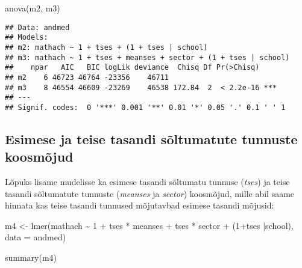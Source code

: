 \documentclass[
]{book}
\newenvironment{Shaded}{\begin{snugshade}}{\end{snugshade}}
\newcommand{\AttributeTok}[1]{\textcolor[rgb]{0.77,0.63,0.00}{#1}}
\newcommand{\DecValTok}[1]{\textcolor[rgb]{0.00,0.00,0.81}{#1}}
\newcommand{\FunctionTok}[1]{\textcolor[rgb]{0.00,0.00,0.00}{#1}}
\newcommand{\NormalTok}[1]{#1}
\newcommand{\OtherTok}[1]{\textcolor[rgb]{0.56,0.35,0.01}{#1}}
\newcommand{\SpecialCharTok}[1]{\textcolor[rgb]{0.00,0.00,0.00}{#1}}
\begin{document}
\begin{Shaded}
\begin{Highlighting}[]
\FunctionTok{anova}\NormalTok{(m2, m3)}
\end{Highlighting}
\end{Shaded}

\begin{verbatim}
## Data: andmed
## Models:
## m2: mathach ~ 1 + tses + (1 + tses | school)
## m3: mathach ~ 1 + tses + meanses + sector + (1 + tses | school)
##    npar   AIC   BIC logLik deviance  Chisq Df Pr(>Chisq)    
## m2    6 46723 46764 -23356    46711                         
## m3    8 46554 46609 -23269    46538 172.84  2  < 2.2e-16 ***
## ---
## Signif. codes:  0 '***' 0.001 '**' 0.01 '*' 0.05 '.' 0.1 ' ' 1
\end{verbatim}

\hypertarget{esimese-ja-teise-tasandi-suxf5ltumatute-tunnuste-koosmuxf5jud}{%
\subsection{Esimese ja teise tasandi sõltumatute tunnuste koosmõjud}\label{esimese-ja-teise-tasandi-suxf5ltumatute-tunnuste-koosmuxf5jud}}

Lõpuks lisame mudelisse ka esimese tasandi sõltumatu tunnuse (\emph{tses}) ja teise tasandi sõltumatute tunnuste (\emph{meanses} ja \emph{sector}) koosmõjud, mille abil saame hinnata kas teise tasandi tunnused mõjutavbad esimese tasandi mõjusid:

\begin{Shaded}
\begin{Highlighting}[]
\NormalTok{m4 }\OtherTok{\textless{}{-}} \FunctionTok{lmer}\NormalTok{(mathach }\SpecialCharTok{\textasciitilde{}} \DecValTok{1} \SpecialCharTok{+}\NormalTok{ tses }\SpecialCharTok{*}\NormalTok{ meanses }\SpecialCharTok{+}\NormalTok{ tses }\SpecialCharTok{*}\NormalTok{ sector }\SpecialCharTok{+}\NormalTok{ (}\DecValTok{1}\SpecialCharTok{+}\NormalTok{tses }\SpecialCharTok{|}\NormalTok{school), }\AttributeTok{data =}\NormalTok{ andmed)}
\end{Highlighting}
\end{Shaded}

\begin{Shaded}
\begin{Highlighting}[]
\FunctionTok{summary}\NormalTok{(m4)}
\end{Highlighting}
\end{Shaded}
\end{document}
